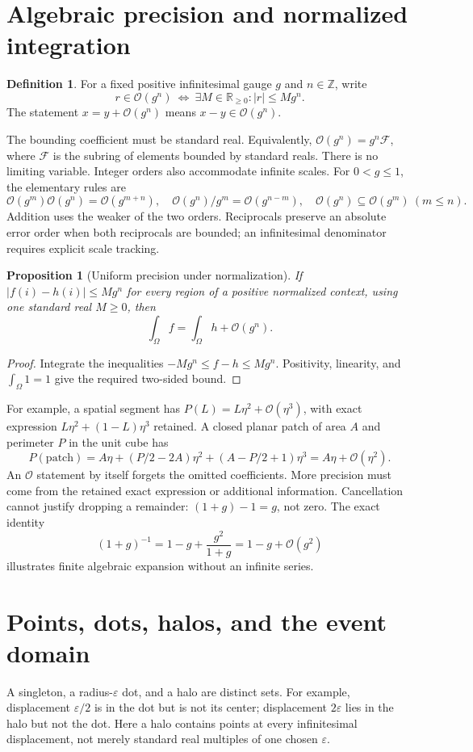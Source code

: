 \documentclass[11pt]{article}
\newtheorem{proposition}[theorem]{Proposition}
\theoremstyle{definition}
\newtheorem{definition}[theorem]{Definition}
\theoremstyle{remark}
\newcommand{\R}{\mathbb R}
\newcommand{\Z}{\mathbb Z}
\newcommand{\eps}{\varepsilon}
\newcommand{\OO}{\mathcal O}
\begin{document}
\section{Algebraic precision and normalized integration}
\begin{definition}
For a fixed positive infinitesimal gauge $g$ and $n\in\Z$, write
\[
 r\in\OO(g^n)\ \Longleftrightarrow\
 \exists M\in\R_{\geq0}: |r|\leq Mg^n.
\]
The statement $x=y+\OO(g^n)$ means $x-y\in\OO(g^n)$.
\end{definition}
The bounding coefficient must be standard real. Equivalently,
$\OO(g^n)=g^n\mathcal F$, where $\mathcal F$ is the subring of elements
bounded by standard reals. There is no limiting variable. Integer orders
also accommodate infinite scales. For $0<g\leq1$, the elementary rules are
\[
 \OO(g^m)\OO(g^n)=\OO(g^{m+n}),\quad
 \OO(g^n)/g^m=\OO(g^{n-m}),\quad
 \OO(g^n)\subseteq\OO(g^m)\ (m\leq n).
\]
Addition uses the weaker of the two orders. Reciprocals preserve an
absolute error order when both reciprocals are bounded; an infinitesimal
denominator requires explicit scale tracking.

\begin{proposition}[Uniform precision under normalization]
If $|f(i)-h(i)|\leq Mg^n$ for every region of a positive normalized
context, using one standard real $M\geq0$, then
\[
 \int_\Omega f=\int_\Omega h+\OO(g^n).
\]
\end{proposition}
\begin{proof}
Integrate the inequalities $-Mg^n\leq f-h\leq Mg^n$. Positivity,
linearity, and $\int_\Omega1=1$ give the required two-sided bound.
\end{proof}

For example, a spatial segment has
$P(L)=L\eta^2+\OO(\eta^3)$, with exact expression
$L\eta^2+(1-L)\eta^3$ retained. A closed planar patch of area $A$ and
perimeter $P$ in the unit cube has
\[
 P(\text{patch})=A\eta+(P/2-2A)\eta^2+(A-P/2+1)\eta^3
               =A\eta+\OO(\eta^2).
\]
An $\OO$ statement by itself forgets the omitted coefficients. More
precision must come from the retained exact expression or additional
information. Cancellation cannot justify dropping a remainder: $(1+g)-1=g$,
not zero. The exact identity
\[
 (1+g)^{-1}=1-g+\frac{g^2}{1+g}=1-g+\OO(g^2)
\]
illustrates finite algebraic expansion without an infinite series.

\section{Points, dots, halos, and the event domain}
A singleton, a radius-$\eps$ dot, and a halo are distinct sets. For
example, displacement $\eps/2$ is in the dot but is not its center;
displacement $2\eps$ lies in the halo but not the dot. Here a halo
contains points at every infinitesimal displacement, not merely standard
real multiples of one chosen $\eps$.
\end{document}
